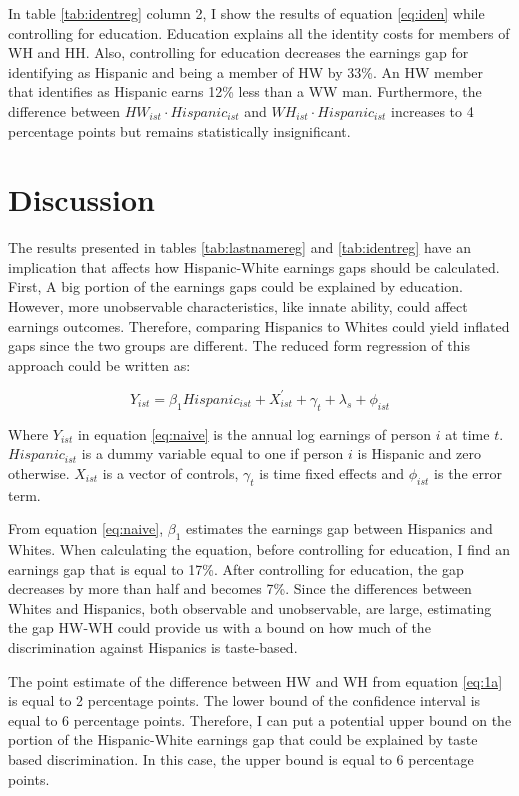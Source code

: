 \documentclass{wptemp}
\begin{document}
In table  \ref{tab:identreg} column 2, I show the results of equation \ref{eq:iden} while controlling for education. Education explains all the identity costs for members of WH and HH. Also, controlling for education decreases the earnings gap for identifying as Hispanic and being a member of HW by 33\%. An HW member that identifies as Hispanic earns 12\% less than a WW man. Furthermore, the difference between $HW_{ist} \cdot Hispanic_{ist}$  and $WH_{ist} \cdot Hispanic_{ist}$ increases to 4 percentage points but remains statistically insignificant.

\section{Discussion}
 
 The results presented in tables \ref{tab:lastnamereg} and \ref{tab:identreg} have an implication that affects how Hispanic-White earnings gaps should be calculated. First, A big portion of the earnings gaps could be explained by education. However, more unobservable characteristics, like innate ability, could affect earnings outcomes. Therefore, comparing Hispanics to Whites could yield inflated gaps since the two groups are different. The reduced form regression of this approach could be written as:
 
 \begin{equation} \label{eq:naive}
 Y_{ist} = \beta_{1} Hispanic_{ist} + X_{ist}^{\prime} + \gamma_{t} + \lambda_s + \phi_{ist}
 \end{equation}
 
Where $Y_{ist}$ in equation \ref{eq:naive} is the annual log earnings of person $i$ at time $t$. $Hispanic_{ist}$ is a dummy variable equal to one if person $i$ is Hispanic and zero otherwise. $X_{ist}$ is a vector of controls, $\gamma_{t}$ is time fixed effects and $\phi_{ist}$ is the error term.
 
From equation \ref{eq:naive}, $\beta_{1}$ estimates the earnings gap between Hispanics and Whites. When calculating the equation, before controlling for education, I find an earnings gap that is equal to 17\%. After controlling for education, the gap decreases by more than half and becomes 7\%. Since the differences between Whites and Hispanics, both observable and unobservable, are large, estimating the gap HW-WH could provide us with a bound on how much of the discrimination against Hispanics is taste-based. 
 
The point estimate of the difference between HW and WH from equation \ref{eq:1a} is equal to 2 percentage points. The lower bound of the confidence interval is equal to 6 percentage points. Therefore, I can put a potential upper bound on the portion of the Hispanic-White earnings gap that could be explained by taste based discrimination. In this case, the upper bound is equal to 6 percentage points.
\end{document}
